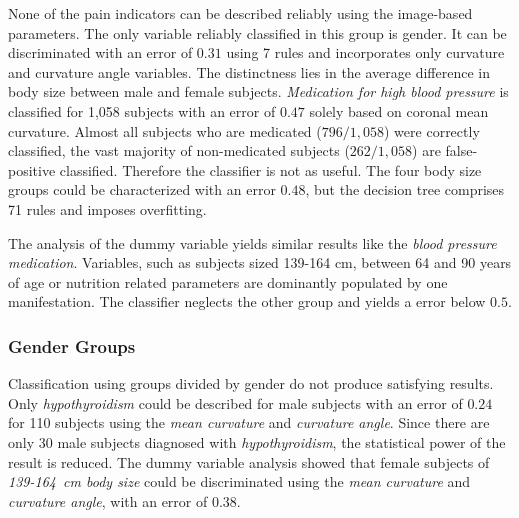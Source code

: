 \documentclass[a4paper,twoside]{style/article}
\begin{document}
None of the pain indicators can be described reliably using the image-based parameters.
The only variable reliably classified in this group is gender. %
%
It can be discriminated with an error of $0.31$ using 7 rules and incorporates only curvature and curvature angle variables.
The distinctness lies in the average difference in body size between male and female subjects.
%
\emph{Medication for high blood pressure} is classified for 1,058 subjects with an error of $0.47$ solely based on coronal mean curvature.
Almost all subjects who are medicated ($796/1,058$) were correctly classified, the vast majority of non-medicated subjects ($262/1,058$) are false-positive classified.
Therefore the classifier is not as useful.
The four body size groups could be characterized with an error $0.48$, but the decision tree comprises 71 rules and imposes overfitting.

The analysis of the dummy variable yields similar results like the \emph{blood pressure medication}.
Variables, such as subjects sized 139-164 cm, between 64 and 90 years of age or nutrition related parameters are dominantly populated by one manifestation.
The classifier neglects the other group and yields a error below $0.5$.
\subsubsection{Gender Groups}
Classification using groups divided by gender do not produce satisfying results.
Only \emph{hypothyroidism} could be described for male subjects with an error of $0.24$ for 110 subjects using the \emph{mean curvature} and \emph{curvature angle}.
Since there are only 30 male subjects diagnosed with \emph{hypothyroidism}, the statistical power of the result is reduced.
The dummy variable analysis showed that female subjects of \emph{139-164~cm body size} could be discriminated using the \emph{mean curvature} and \emph{curvature angle}, with an error of $0.38$.
\end{document}
